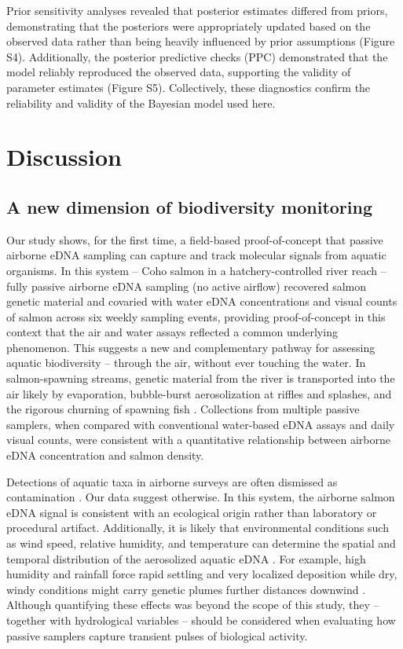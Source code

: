 \documentclass{article}
\begin{document}
Prior sensitivity analyses revealed that posterior estimates differed from priors, demonstrating that the posteriors were appropriately updated based on the observed data rather than being heavily influenced by prior assumptions (Figure S4). Additionally, the posterior predictive checks (PPC) demonstrated that the model reliably reproduced the observed data, supporting the validity of parameter estimates (Figure S5).  Collectively, these diagnostics confirm the reliability and validity of the Bayesian model used here.

\section{Discussion}
\subsection{A new dimension of biodiversity monitoring}
Our study shows, for the first time, a field-based proof-of-concept that passive airborne eDNA sampling can capture and track molecular signals from aquatic organisms. In this system -- Coho salmon in a hatchery-controlled river reach -- fully passive airborne eDNA sampling (no active airflow) recovered salmon genetic material and covaried with water eDNA concentrations and visual counts of salmon across six weekly sampling events, providing proof-of-concept in this context that the air and water assays reflected a common underlying phenomenon. This suggests a new and complementary pathway for assessing aquatic biodiversity – through the air, without ever touching the water. In salmon-spawning streams, genetic material from the river is transported into the air likely by evaporation, bubble-burst aerosolization at riffles and splashes, and the rigorous churning of spawning fish \cite{wood2021, prather2013}. Collections from multiple passive samplers, when compared with conventional water-based eDNA assays and daily visual counts, were consistent with a quantitative relationship between airborne eDNA concentration and salmon density.

Detections of aquatic taxa in airborne surveys are often dismissed as contamination \cite{klepke2022, lynggaard2023, sullivan2023, lynggaard2022}. Our data suggest otherwise. In this system, the airborne salmon eDNA signal is consistent with an ecological origin rather than laboratory or procedural artifact. Additionally, it is likely that environmental conditions such as wind speed, relative humidity, and temperature can determine the spatial and temporal distribution of the aerosolized aquatic eDNA \cite{abrego2024, giolai2024}. For example, high humidity and rainfall force rapid settling and very localized deposition while dry, windy conditions might carry genetic plumes further distances downwind \cite{galban2021,maki2023}. Although quantifying these effects was beyond the scope of this study, they – together with hydrological variables – should be considered when evaluating how passive samplers capture transient pulses of biological activity.
\end{document}
